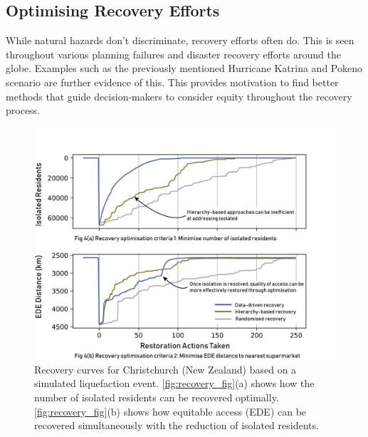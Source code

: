 \documentclass[review,3p,times,onecolumn,sort&compress,12pt]{elsarticle}
\begin{document}
\subsection{Optimising Recovery Efforts}
While natural hazards don't discriminate, recovery efforts often do.
This is seen throughout various planning failures and disaster recovery efforts around the globe.
Examples such as the previously mentioned Hurricane Katrina and Pokeno scenario are further evidence of this.
This provides motivation to find better methods that guide decision-makers to consider equity throughout the recovery process.

\begin{figure}[b!]
    \includegraphics[width=0.95\linewidth]{report/fig/recovery_fig.png}
    \caption{Recovery curves for Christchurch (New Zealand) based on a simulated liquefaction event. \autoref{fig:recovery_fig}(a) shows how the number of isolated residents can be recovered optimally. \autoref{fig:recovery_fig}(b) shows how equitable access (EDE) can be recovered simultaneously with the reduction of isolated residents.}
    \label{fig:recovery_fig}
\end{figure}
\end{document}
